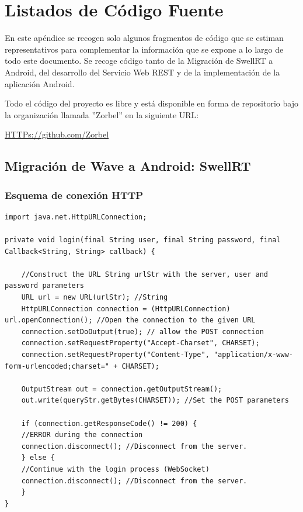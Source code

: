 

\chapter{Listados de Código Fuente}

En este apéndice se recogen solo algunos fragmentos de código que se estiman representativos para complementar la información que se expone a lo largo de todo este documento. Se recoge código tanto de la Migración de SwellRT a Android, del desarrollo del Servicio Web REST y de la implementación de la aplicación Android.

Todo el código del proyecto es libre y está disponible en forma de repositorio bajo la organización llamada ''Zorbel'' en la siguiente URL:
    
    \url{HTTPs://github.com/Zorbel}    

\section{Migración de Wave a Android: SwellRT}

\subsection{Esquema de conexión HTTP}\label{ssec:codeHTTP}

	  \begin{lstlisting}[frame=single]	  
import java.net.HttpURLConnection;

private void login(final String user, final String password, final Callback<String, String> callback) {
  
    //Construct the URL String urlStr with the server, user and password parameters
    URL url = new URL(urlStr); //String 
    HttpURLConnection connection = (HttpURLConnection) url.openConnection(); //Open the connection to the given URL 
    connection.setDoOutput(true); // allow the POST connection
    connection.setRequestProperty("Accept-Charset", CHARSET);
    connection.setRequestProperty("Content-Type", "application/x-www-form-urlencoded;charset=" + CHARSET);

    OutputStream out = connection.getOutputStream(); 
    out.write(queryStr.getBytes(CHARSET)); //Set the POST parameters

    if (connection.getResponseCode() != 200) {
	//ERROR during the connection
	connection.disconnect(); //Disconnect from the server.
    } else {
	//Continue with the login process (WebSocket)
	connection.disconnect(); //Disconnect from the server.
    }		      
}	    
	  \end{lstlisting}  
	  
